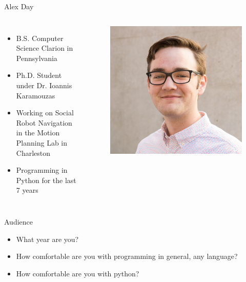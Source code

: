 \documentclass[aspectratio=169,xcolor=dvipsnames]{beamer}
\begin{document}
\begin{frame}{Alex Day}

  \begin{columns}[c]
    \begin{itemize}
        \item B.S. Computer Science Clarion in Pennsylvania
        \item Ph.D. Student under Dr. Ioannis Karamouzas
        \item Working on Social Robot Navigation in the Motion Planning Lab in Charleston
        \item Programming in Python for the last 7 years
    \end{itemize}

    \begin{figure}
        \includegraphics[width=1.0\textwidth]{imgs/profile.png}
    \end{figure}
  \end{columns}
\end{frame}


\begin{frame}{Audience}
    \begin{itemize}[<+-|+>]
        \item What year are you?
        \item How comfortable are you with programming in general, any language?
        \item How comfortable are you with python?
    \end{itemize}
\end{frame}
\end{document}
